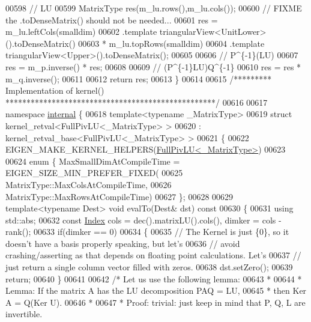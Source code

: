\begin{DoxyCode}
00598   \textcolor{comment}{// LU}
00599   MatrixType res(m\_lu.rows(),m\_lu.cols());
00600   \textcolor{comment}{// FIXME the .toDenseMatrix() should not be needed...}
00601   res = m\_lu.leftCols(smalldim)
00602             .template triangularView<UnitLower>().toDenseMatrix()
00603       * m\_lu.topRows(smalldim)
00604             .template triangularView<Upper>().toDenseMatrix();
00605 
00606   \textcolor{comment}{// P^\{-1\}(LU)}
00607   res = m\_p.inverse() * res;
00608 
00609   \textcolor{comment}{// (P^\{-1\}LU)Q^\{-1\}}
00610   res = res * m\_q.inverse();
00611 
00612   \textcolor{keywordflow}{return} res;
00613 \}
00614 
00615 \textcolor{comment}{/********* Implementation of kernel() **************************************************/}
00616 
00617 \textcolor{keyword}{namespace }\hyperlink{namespaceinternal}{internal} \{
00618 \textcolor{keyword}{template}<\textcolor{keyword}{typename} \_MatrixType>
00619 \textcolor{keyword}{struct }kernel\_retval<FullPivLU<\_MatrixType> >
00620   : kernel\_retval\_base<FullPivLU<\_MatrixType> >
00621 \{
00622   EIGEN\_MAKE\_KERNEL\_HELPERS(\hyperlink{group___l_u___module_class_eigen_1_1_full_piv_l_u}{FullPivLU<\_MatrixType>})
00623 
00624   \textcolor{keyword}{enum} \{ MaxSmallDimAtCompileTime = EIGEN\_SIZE\_MIN\_PREFER\_FIXED(
00625             MatrixType::MaxColsAtCompileTime,
00626             MatrixType::MaxRowsAtCompileTime)
00627   \};
00628 
00629   \textcolor{keyword}{template}<\textcolor{keyword}{typename} Dest> \textcolor{keywordtype}{void} evalTo(Dest& dst)\textcolor{keyword}{ const}
00630 \textcolor{keyword}{  }\{
00631     \textcolor{keyword}{using} std::abs;
00632     \textcolor{keyword}{const} \hyperlink{group___core___module_a554f30542cc2316add4b1ea0a492ff02}{Index} cols = dec().matrixLU().cols(), dimker = cols - rank();
00633     \textcolor{keywordflow}{if}(dimker == 0)
00634     \{
00635       \textcolor{comment}{// The Kernel is just \{0\}, so it doesn't have a basis properly speaking, but let's}
00636       \textcolor{comment}{// avoid crashing/asserting as that depends on floating point calculations. Let's}
00637       \textcolor{comment}{// just return a single column vector filled with zeros.}
00638       dst.setZero();
00639       \textcolor{keywordflow}{return};
00640     \}
00641 
00642     \textcolor{comment}{/* Let us use the following lemma:}
00643 \textcolor{comment}{      *}
00644 \textcolor{comment}{      * Lemma: If the matrix A has the LU decomposition PAQ = LU,}
00645 \textcolor{comment}{      * then Ker A = Q(Ker U).}
00646 \textcolor{comment}{      *}
00647 \textcolor{comment}{      * Proof: trivial: just keep in mind that P, Q, L are invertible.}

\end{DoxyCode}

